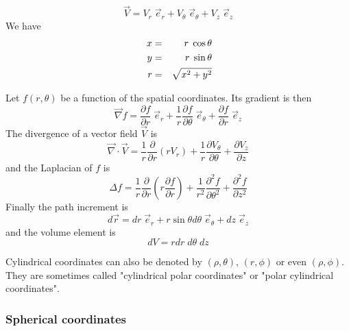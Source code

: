 \[
{\vec V} 
= V_r \; \vec{e}_r  + V_\theta \; \vec{e}_\theta + V_z \; \vec{e}_z
\]
We have 
\begin{eqnarray}
x &=& r \; \cos\theta \nn\\
y &=& r \; \sin \theta \nn\\\ 
r &=& \sqrt{x^2+y^2} \nn
\end{eqnarray}

Let $f(r,\theta)$ be a function of the spatial coordinates. Its gradient is then
\[
\vec \nabla f
= \frac{\partial f}{\partial r} \; \vec{e}_r 
+ \frac{1}{r} \frac{\partial f}{\partial \theta} \; \vec{e}_\theta
+ \frac{\partial f}{\partial r} \; \vec{e}_z
\]
The divergence of a vector field $\vec{V}$ is 
\[
\vec\nabla \cdot \vec{V} 
= \frac{1}{r} \frac{\partial }{\partial r} (r V_r) 
+ \frac{1}{r} \frac{\partial V_\theta}{\partial \theta} 
+ \frac{\partial V_z}{\partial z}
\]
and the Laplacian of $f$ is
\[
\Delta f = \frac{1}{r} \frac{\partial }{\partial r} \left( r \frac{\partial f}{\partial r} \right)
+ \frac{1}{r^2} \frac{\partial^2 f}{\partial \theta^2} 
+ \frac{\partial^2 f}{\partial z^2} 
\]
Finally the path increment is
\[
d\vec{r} = dr \; {\vec e}_r  + r \sin\theta d\theta \; {\vec e}_\theta + dz \; \vec{e}_z
\]
and the volume element is 
\[
dV= r dr \; d\theta \; dz
\]

\begin{remark} 
Cylindrical coordinates can also be denoted by $(\rho,\theta)$, $(r,\phi)$ or even $(\rho,\phi)$.
They are sometimes called "cylindrical polar coordinates" or "polar cylindrical coordinates".
\end{remark}

\subsubsection{Spherical coordinates \label{ss:sphercoord}}

